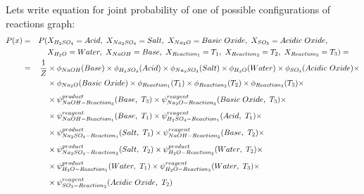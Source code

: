 \documentclass[10pt]{article}
\begin{document}
\begin{tcolorbox}[colback=gray!5,colframe=gray!70,title=Example of factorized chemical reactions graph,left=7pt, right=7pt]
Lets write equation for joint probability of one of possible configurations of reactions graph:
\begin{equation*}
\begin{aligned}
        P(x) & = & P( & X_{H_2SO_4} = Acid,\ X_{Na_2SO_4} = Salt,\ X_{Na_2O} = Basic\ Oxide,\ X_{SO_3} = Acidic\ Oxide, \\
                &    &     & X_{H_2O} = Water,\ X_{NaOH} = Base,\ X_{Reaction_1} = T_1,\ X_{Reaction_2} = T_2,\ X_{Reaction_3} = T_3) = \\
                & = & {1 \over Z} & \times \phi_{NaOH}(Base) \times \phi_{H_2SO_4}(Acid) \times \phi_{Na_2SO_4}(Salt) \times \phi_{H_2O}(Water) \times \phi_{SO_3}(Acidic\ Oxide) \times \\ 
                &    &                   & \times \phi_{Na_2O}(Basic\ Oxide) \times \phi_{Reaction_1}(T_1) \times \phi_{Reaction_2}(T_2) \times \phi_{Reaction_3}(T_3) \times \\[4pt]
                &    &                   & \times \psi^{product}_{NaOH-Reaction_3}(Base,\ T_3) \times \psi^{reagent}_{Na_2O-Reaction_3}(Basic\ Oxide,\ T_3) \times \\[4pt]
                &    &                   & \times \psi^{reagent}_{NaOH-Reaction_1}(Base,\ T_1) \times \psi^{reagent}_{H_2SO_4-Reaction_1}(Acid,\ T_1) \times  \\[4pt]
                &    &                   & \times \psi^{product}_{Na_2SO_4-Reaction_1}(Salt,\ T_1) \times \psi^{reagent}_{NaOH-Reaction_2}(Base,\ T_2) \times \\[4pt]
                &    &                   & \times \psi^{product}_{Na_2SO_4-Reaction_2}(Salt,\ T_2) \times \psi^{product}_{H_2O-Reaction_2}(Water,\ T_2) \times \\[4pt]                
                &    &                   & \times \psi^{product}_{H_2O-Reaction_1}(Water,\ T_1) \times \psi^{reagent}_{H_2O-Reaction_3}(Water,\ T_3) \times \\[4pt]
                &    &                   & \times  \psi^{reagent}_{SO_3-Reaction_2}(Acidic\ Oxide,\ T_2) \\
\end{aligned}
\end{equation*}

\end{tcolorbox}

\newpage
\end{document}
